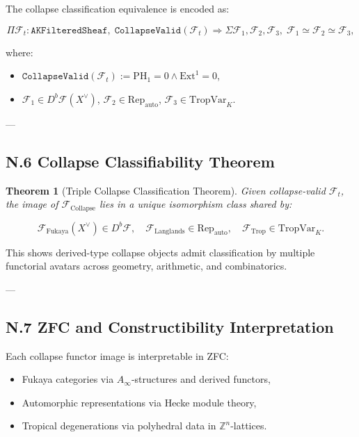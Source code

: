 \documentclass[11pt]{article}
\newtheorem{theorem}{Theorem}[section]
\begin{document}
The collapse classification equivalence is encoded as:

\[
\Pi \mathcal{F}_t : \texttt{AKFilteredSheaf},\;
\texttt{CollapseValid}(\mathcal{F}_t)
\Rightarrow
\Sigma \mathcal{F}_1, \mathcal{F}_2, \mathcal{F}_3,\;
\mathcal{F}_1 \simeq \mathcal{F}_2 \simeq \mathcal{F}_3,
\]

where:
\begin{itemize}
  \item $\texttt{CollapseValid}(\mathcal{F}_t) := \mathrm{PH}_1 = 0 \wedge \mathrm{Ext}^1 = 0$,
  \item $\mathcal{F}_1 \in D^b\mathcal{F}(X^\vee)$, $\mathcal{F}_2 \in \mathrm{Rep}_{\mathrm{auto}}$, $\mathcal{F}_3 \in \mathrm{TropVar}_K$.
\end{itemize}

---

\subsection*{N.6 Collapse Classifiability Theorem}

\begin{theorem}[Triple Collapse Classification Theorem]
Given collapse-valid $\mathcal{F}_t$, the image of $\mathcal{F}_{\mathrm{Collapse}}$ lies in a unique isomorphism class shared by:

\[
\mathcal{F}_{\mathrm{Fukaya}}(X^\vee) \in D^b\mathcal{F},
\quad
\mathcal{F}_{\mathrm{Langlands}} \in \mathrm{Rep}_{\mathrm{auto}},
\quad
\mathcal{F}_{\mathrm{Trop}} \in \mathrm{TropVar}_K.
\]
\end{theorem}

This shows derived-type collapse objects admit classification by multiple functorial avatars across geometry, arithmetic, and combinatorics.

---

\subsection*{N.7 ZFC and Constructibility Interpretation}

Each collapse functor image is interpretable in ZFC:

\begin{itemize}
  \item Fukaya categories via $A_\infty$-structures and derived functors,
  \item Automorphic representations via Hecke module theory,
  \item Tropical degenerations via polyhedral data in $\mathbb{Z}^n$-lattices.
\end{itemize}
\end{document}
